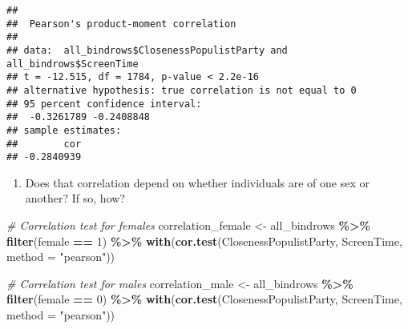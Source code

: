 \documentclass[
]{book}
\newenvironment{Shaded}{\begin{snugshade}}{\end{snugshade}}
\newcommand{\AttributeTok}[1]{\textcolor[rgb]{0.13,0.29,0.53}{#1}}
\newcommand{\CommentTok}[1]{\textcolor[rgb]{0.56,0.35,0.01}{\textit{#1}}}
\newcommand{\DecValTok}[1]{\textcolor[rgb]{0.00,0.00,0.81}{#1}}
\newcommand{\FunctionTok}[1]{\textcolor[rgb]{0.13,0.29,0.53}{\textbf{#1}}}
\newcommand{\NormalTok}[1]{#1}
\newcommand{\OtherTok}[1]{\textcolor[rgb]{0.56,0.35,0.01}{#1}}
\newcommand{\SpecialCharTok}[1]{\textcolor[rgb]{0.81,0.36,0.00}{\textbf{#1}}}
\newcommand{\StringTok}[1]{\textcolor[rgb]{0.31,0.60,0.02}{#1}}
\providecommand{\tightlist}{%
  \setlength{\itemsep}{0pt}\setlength{\parskip}{0pt}}
\begin{document}
\begin{Shaded}
\end{Shaded}

\begin{verbatim}
## 
##  Pearson's product-moment correlation
## 
## data:  all_bindrows$ClosenessPopulistParty and all_bindrows$ScreenTime
## t = -12.515, df = 1784, p-value < 2.2e-16
## alternative hypothesis: true correlation is not equal to 0
## 95 percent confidence interval:
##  -0.3261789 -0.2408848
## sample estimates:
##        cor 
## -0.2840939
\end{verbatim}

\begin{enumerate}
\def\labelenumi{\arabic{enumi}.}
\setcounter{enumi}{2}
\tightlist
\item
  Does that correlation depend on whether individuals are of one sex or another? If so, how?
\end{enumerate}

\begin{Shaded}
\begin{Highlighting}[]
\CommentTok{\# Correlation test for females}
\NormalTok{correlation\_female }\OtherTok{\textless{}{-}}\NormalTok{ all\_bindrows }\SpecialCharTok{\%\textgreater{}\%}
  \FunctionTok{filter}\NormalTok{(female }\SpecialCharTok{==} \DecValTok{1}\NormalTok{) }\SpecialCharTok{\%\textgreater{}\%}
  \FunctionTok{with}\NormalTok{(}\FunctionTok{cor.test}\NormalTok{(ClosenessPopulistParty, ScreenTime, }\AttributeTok{method =} \StringTok{"pearson"}\NormalTok{))}

\CommentTok{\# Correlation test for males}
\NormalTok{correlation\_male }\OtherTok{\textless{}{-}}\NormalTok{ all\_bindrows }\SpecialCharTok{\%\textgreater{}\%}
  \FunctionTok{filter}\NormalTok{(female }\SpecialCharTok{==} \DecValTok{0}\NormalTok{) }\SpecialCharTok{\%\textgreater{}\%}
  \FunctionTok{with}\NormalTok{(}\FunctionTok{cor.test}\NormalTok{(ClosenessPopulistParty, ScreenTime, }\AttributeTok{method =} \StringTok{"pearson"}\NormalTok{))}
\end{Highlighting}
\end{Shaded}
\end{document}
